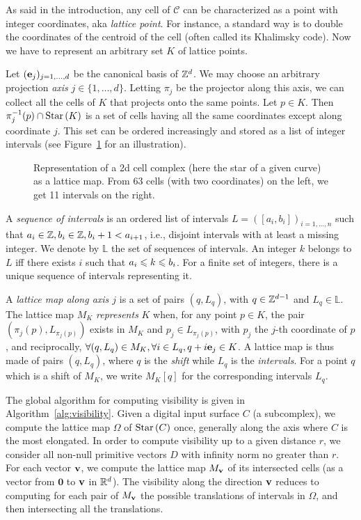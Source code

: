 As said in the introduction, any cell of $\mathcal{C}$ can be
characterized as a point with integer coordinates, aka \emph{lattice
point}. For instance, a standard way is to double the coordinates of
the centroid of the cell (often called its Khalimsky code). Now we
have to represent an arbitrary set $K$ of lattice points.

Let $(\mathbf{e}_j)_{j=1,\dots,d}$ be the canonical basis of $\mathbb{Z}^d$.  We may
choose an arbitrary projection \emph{axis} $j \in
\{1,\ldots,d\}$. Letting $\pi_j$ be the projector along this axis, we
can collect all the cells of $K$ that projects onto the same
points. Let $p \in K$. Then $\pi^{-1}_j(p) \cap \mathrm{Star}\left(K\right)$ is a set of cells having
all the same coordinates except along coordinate $j$. This set can be
ordered increasingly and stored as a list of integer intervals (see
Figure~\ref{fig:lattice-representation} for an illustration).

\begin{figure}[t]
  \centering
  
  \caption{\label{fig:lattice-representation} Representation of a
    2d cell complex (here the star of a given curve) as a lattice
    map. From 63 cells (with two coordinates) on the left, we get 11
    intervals on the right.}
\end{figure}


A \emph{sequence of intervals} is an ordered list of intervals $L =
([a_i,b_i])_{i=1,\ldots,n}$ such that $a_i \in \mathbb{Z}, b_i \in \mathbb{Z}, b_i + 1
< a_{i+1}$, i.e., disjoint intervals with at least a missing
integer. We denote by $\mathbb{L}$ the set of sequences of
intervals. An integer $k$ belongs to $L$ iff there exists $i$ such that
$a_i \leqslant k \leqslant b_i$. For a finite set of integers, there is a unique
sequence of intervals representing it.

A \emph{lattice map along axis $j$} is a set of pairs $(q,L_q)$, with
$q \in \mathbb{Z}^{d-1}$ and $L_q \in \mathbb{L}$. The lattice map $M_K$
\emph{represents} $K$ when, for any point $p \in K$, the pair
$(\pi_j(p), L_{\pi_j(p)})$ exists in $M_K$ and $p_j \in L_{\pi_j(p)}$,
with $p_j$ the $j$-th coordinate of $p$, and reciprocally, $\forall
(q,L_q) \in M_K, \forall i \in L_q, q+i\mathbf{e}_j \in K$. A lattice map is
thus made of pairs $(q,L_q)$, where $q$ is the \emph{shift} while
$L_q$ is the \emph{intervals}. For a point $q$ which is a shift of
$M_K$, we write $M_K[q]$ for the corresponding intervals $L_q$.

The global algorithm for computing visibility is given in
Algorithm~\ref{alg:visibility}.  Given a digital input surface $C$ (a
subcomplex), we compute the lattice map $\Omega$ of $\mathrm{Star}\left(C\right)$ once,
generally along the axis where $C$ is the most elongated. In order to
compute visibility up to a given distance $r$, we consider all non-null
primitive vectors $D$ with infinity norm no greater than $r$.
For each vector $\mathbf{v}$, we compute the lattice map $M_{\mathbf{v}}$ of its
intersected cells (as a vector from $\mathbf{0}$ to $\mathbf{v}$ in
$\mathbb{R}^d$). The visibility along the direction $\mathbf{v}$ reduces to computing
for each pair of $M_{\mathbf{v}}$ the possible translations of intervals in
$\Omega$, and then intersecting all the translations.

